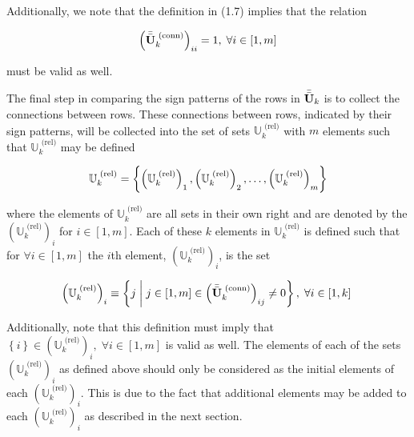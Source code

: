 \documentclass[../../ClusteringConnectionsMAIN.tex]{subfiles}
\begin{document}
\begin{flushleft}
\begin{large}
Additionally, we note that the definition in (1.7) implies that the relation

\begin{align*}
\left( \bar{\bar{\mathbf{U}}}_k^\text{ (conn)} \right)_{ii} = 1, \; \forall i \in \left[ 1, m \right]
\end{align*}

must be valid as well. \newline


The final step in comparing the sign patterns of the rows in $\bar{\bar{\mathbf{U}}}_k$ is to collect the connections between rows.  These connections between rows, indicated by their sign patterns, will be collected into the set of sets $\mathbb{U}_k^\text{ (rel)}$ with $m$ elements such that $\mathbb{U}_k^\text{ (rel)}$ may be defined

\begin{align}
\mathbb{U}_k^\text{ (rel)} = \biggl\{ \left(\mathbb{U}_k^\text{ (rel)}\right)_1, \left(\mathbb{U}_k^\text{ (rel)}\right)_2, \dots, \left(\mathbb{U}_k^\text{ (rel)}\right)_m \biggr\}  \notag
\end{align}

where the elements of $\mathbb{U}_k^\text{ (rel)}$ are all sets in their own right and are denoted by the $\left( \mathbb{U}_k^\text{ (rel)} \right)_i$ for $i \in \left[ 1, m \right]$.  Each of these $k$ elements in $\mathbb{U}_k^\text{ (rel)}$ is defined such that for $\forall i \in \left[ 1, m \right]$ the $i$th element, $\left( \mathbb{U}_k^\text{ (rel)} \right)_i$, is the set 

\begin{align}
\left( \mathbb{U}_k^\text{ (rel)} \right)_i \equiv \left\{ j \; \biggl| \biggr. \; j \in \left[ 1, m \right] \in \left( \bar{\bar{\mathbf{U}}}_k^\text{ (conn)} \right)_{ij} \neq 0 \right\}, \; \forall i \in \left[ 1, k \right] \; 
\end{align}

Additionally, note that this definition must imply that $\left\{ i \right\} \in \left( \mathbb{U}_k^\text{ (rel)} \right)_i, \; \forall i \in \left[ 1, m \right]$ is valid as well.  The elements of each of the sets $\left( \mathbb{U}_k^\text{ (rel)} \right)_i$ as defined above should only be considered as the initial elements of each $\left( \mathbb{U}_k^\text{ (rel)} \right)_i$.  This is due to the fact that additional elements may be added to each $\left( \mathbb{U}_k^\text{ (rel)} \right)_i$ as described in the next section.


\end{large}
\end{flushleft}
\end{document}
